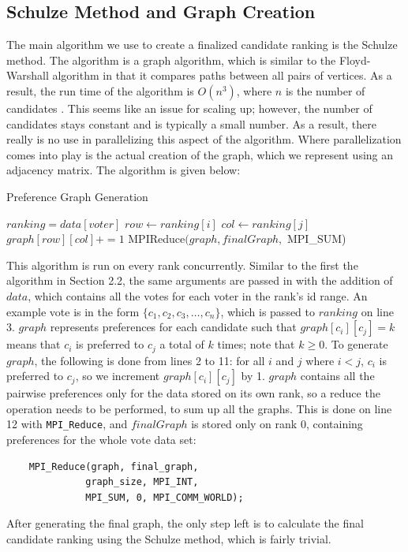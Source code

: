 \documentclass[final,5p,times,twocolumn,authoryear, 10pt]{elsarticle}
\newcommand{\C}[1]{\lstinline{#1}}
\begin{document}
\subsection{Schulze Method and Graph Creation}
\label{Schulze Method and Graph Creation}
The main algorithm we use to create a finalized candidate ranking is the
Schulze method. The algorithm is a graph algorithm, which is similar to the
Floyd-Warshall algorithm in that it compares paths between all pairs of
vertices. As a result, the run time of the algorithm is $O(n^3)$, where $n$ is
the number of candidates \cite{schulze1}. This seems like an issue for scaling
up; however, the number of candidates stays constant and is typically a small
number. As a result, there really is no use in parallelizing this aspect of the
algorithm. Where parallelization comes into play is the actual creation of the
graph, which we represent using an adjacency matrix. The algorithm is given
below:
\begin{algorithm}[H]
    \caption{Preference Graph Generation}\label{alg:cap}
    \begin{algorithmic}[1]
        \State $ranking = data[voter]$ 
            \State $row \gets ranking[i]$
            \State $col \gets ranking[j]$
            \State $graph[row][col] += 1$
            \EndFor
        \EndFor
    \EndFor
    \State MPIReduce$(graph, finalGraph,$ MPI\_SUM)
    \EndProcedure
    \end{algorithmic}
\end{algorithm}

This algorithm is run on every rank concurrently. Similar to the first the
algorithm in Section 2.2, the same arguments are passed in with the addition of
$data$, which contains all the votes for each voter in the rank's id range. An
example vote is in the form $\{c_1, c_2, c_3, \ldots, c_n\}$, which is passed
to $ranking$ on line 3. $graph$ represents preferences for each candidate such
that $graph[c_i][c_j] = k$ means that $c_i$ is preferred to $c_j$ a total of
$k$ times; note that $k \geq 0$. To generate $graph$, the following is done
from lines 2 to 11: for all $i$ and $j$ where $i < j$, $c_i$ is preferred to
$c_j$, so we increment $graph[c_i][c_j]$ by 1. $graph$ contains all the
pairwise preferences only for the data stored on its own rank, so a reduce the
operation needs to be performed, to sum up all the graphs. This is done on line
12 with \C{MPI_Reduce}, and $finalGraph$ is stored only on rank 0, containing
preferences for the whole vote data set:
\begin{center}
    \begin{BVerbatim}
    MPI_Reduce(graph, final_graph, 
              graph_size, MPI_INT,
              MPI_SUM, 0, MPI_COMM_WORLD);
    \end{BVerbatim}
\end{center}
After generating the final graph, the only step left is to calculate the final
candidate ranking using the Schulze method, which is fairly trivial.
\end{document}
